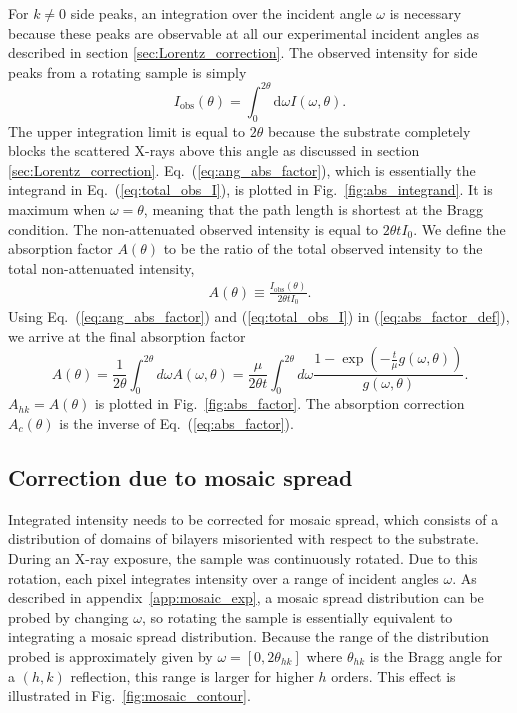 For $k\neq 0$ side peaks, an integration over the incident angle $\omega$
is necessary because these peaks are observable at all our experimental incident angles as
described in section \ref{sec:Lorentz_correction}.
The observed intensity for side peaks from a rotating sample is simply
\begin{equation}
  I_\textrm{obs}(\theta) 
  = \int_0^{2\theta}\textrm{d}\omega I(\omega,\theta).
  \label{eq:total_obs_I}
\end{equation}
The upper integration limit is equal to $2\theta$ because the substrate
completely blocks the scattered X-rays above this angle as discussed in 
section \ref{sec:Lorentz_correction}. Eq.~(\ref{eq:ang_abs_factor}),
which is essentially the integrand in Eq.~(\ref{eq:total_obs_I}), is 
plotted in Fig.~\ref{fig:abs_integrand}. It is maximum when $\omega=\theta$,
meaning that the path length is shortest at the Bragg condition.
The non-attenuated observed intensity is equal to $2\theta t I_0$. We
define the absorption factor $A(\theta)$ to be the ratio of the total 
observed intensity to the total non-attenuated intensity,
\begin{align}
  A(\theta) \equiv \frac{I_\textrm{obs}(\theta)}{2\theta tI_0}. 
  \label{eq:abs_factor_def}
\end{align}
Using Eq.~(\ref{eq:ang_abs_factor}) and (\ref{eq:total_obs_I})
in (\ref{eq:abs_factor_def}), we arrive
at the final absorption factor
\begin{equation}
  A(\theta) = \frac{1}{2\theta}\int_0^{2\theta}d\omega A(\omega,\theta)
  = \frac{\mu}{2\theta t} \int_0^{2\theta}d\omega 
  \frac{1-\exp\left(-\frac{t}{\mu}g(\omega,\theta)\right)}{g(\omega,\theta)}.
  \label{eq:abs_factor}
\end{equation}
$A_{hk} = A(\theta)$ is plotted in Fig.~\ref{fig:abs_factor}.
The absorption correction $A_c(\theta)$ is the inverse of Eq.~(\ref{eq:abs_factor}). 

\subsection{Correction due to mosaic spread}\label{sec:mosaic_spread_correction}
Integrated intensity needs to be corrected for mosaic spread, which consists 
of a distribution of domains of bilayers misoriented with respect to the 
substrate. 
During an X-ray exposure, the sample
was continuously rotated. Due to this rotation, each pixel integrates 
intensity over a range of incident angles $\omega$.
As described in appendix~\ref{app:mosaic_exp}, 
a mosaic spread distribution can be probed
by changing $\omega$, so rotating the sample is essentially  
equivalent to integrating a mosaic spread distribution.
Because the range of the distribution probed is approximately given by $\omega=[0, 2\theta_{hk}]$ 
where $\theta_{hk}$ is the Bragg angle for a $(h,k)$ reflection, 
this range is larger for higher $h$ orders. 
This effect is illustrated in Fig.~\ref{fig:mosaic_contour}.

